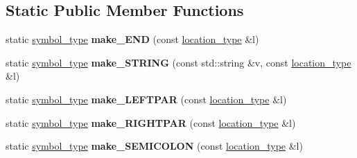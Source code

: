 \subsection*{Static Public Member Functions}
\begin{DoxyCompactItemize}
\item 
static \hyperlink{classEquationParser_1_1Parser_ac7f402ded60cb9ac9bb65f5d2bc9d79c}{symbol\+\_\+type} {\bfseries make\+\_\+\+E\+ND} (const \hyperlink{classEquationParser_1_1Parser_a9c08ca33906dfb521b4ec5989e3620bf}{location\+\_\+type} \&l)\hypertarget{classEquationParser_1_1Parser_a3e315ef0f84cc5caf49b3ece559ca583}{}\label{classEquationParser_1_1Parser_a3e315ef0f84cc5caf49b3ece559ca583}

\item 
static \hyperlink{classEquationParser_1_1Parser_ac7f402ded60cb9ac9bb65f5d2bc9d79c}{symbol\+\_\+type} {\bfseries make\+\_\+\+S\+T\+R\+I\+NG} (const std\+::string \&v, const \hyperlink{classEquationParser_1_1Parser_a9c08ca33906dfb521b4ec5989e3620bf}{location\+\_\+type} \&l)\hypertarget{classEquationParser_1_1Parser_a5bcbdebe3d30968d101a3e84fc70d5b1}{}\label{classEquationParser_1_1Parser_a5bcbdebe3d30968d101a3e84fc70d5b1}

\item 
static \hyperlink{classEquationParser_1_1Parser_ac7f402ded60cb9ac9bb65f5d2bc9d79c}{symbol\+\_\+type} {\bfseries make\+\_\+\+L\+E\+F\+T\+P\+AR} (const \hyperlink{classEquationParser_1_1Parser_a9c08ca33906dfb521b4ec5989e3620bf}{location\+\_\+type} \&l)\hypertarget{classEquationParser_1_1Parser_ad6e4d0885df92817ed3c621cf22fb793}{}\label{classEquationParser_1_1Parser_ad6e4d0885df92817ed3c621cf22fb793}

\item 
static \hyperlink{classEquationParser_1_1Parser_ac7f402ded60cb9ac9bb65f5d2bc9d79c}{symbol\+\_\+type} {\bfseries make\+\_\+\+R\+I\+G\+H\+T\+P\+AR} (const \hyperlink{classEquationParser_1_1Parser_a9c08ca33906dfb521b4ec5989e3620bf}{location\+\_\+type} \&l)\hypertarget{classEquationParser_1_1Parser_a4918c2487120f7d04d6a3b70ef950fee}{}\label{classEquationParser_1_1Parser_a4918c2487120f7d04d6a3b70ef950fee}

\item 
static \hyperlink{classEquationParser_1_1Parser_ac7f402ded60cb9ac9bb65f5d2bc9d79c}{symbol\+\_\+type} {\bfseries make\+\_\+\+S\+E\+M\+I\+C\+O\+L\+ON} (const \hyperlink{classEquationParser_1_1Parser_a9c08ca33906dfb521b4ec5989e3620bf}{location\+\_\+type} \&l)\hypertarget{classEquationParser_1_1Parser_a49676ba6ad45e7b15b5efe331d63ff32}{}\label{classEquationParser_1_1Parser_a49676ba6ad45e7b15b5efe331d63ff32}


\end{DoxyCompactItemize}
